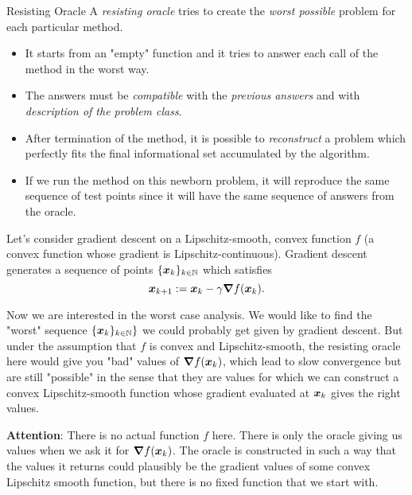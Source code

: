 \begin{colorboxnote}{Resisting Oracle}
    A \emph{resisting oracle} tries to create the \emph{worst possible} problem for each particular method.
    \begin{itemize}
        \item It starts from an "empty" function and it tries to answer each call of the method in the worst way.
        \item The answers must be \emph{compatible} with the \emph{previous answers} and with \emph{description of the problem class}.
        \item After termination of the method, it is possible to \emph{reconstruct} a problem which perfectly fits the final informational set accumulated by the algorithm.
        \item If we run the method on this newborn problem, it will reproduce the same sequence of test points since it will have the same sequence of answers from the oracle.
    \end{itemize}
\end{colorboxnote}

\begin{example}
    Let's consider gradient descent on a Lipschitz-smooth, convex function \(f\) (a convex function whose gradient is Lipschitz-continuous). Gradient descent generates a sequence 
    of points \(\{\boldsymbol{x}_k\}_{k \in \mathbb{N}}\) which satisfies
    \[
        \boldsymbol{x}_{k+1} := \boldsymbol{x}_{k} - \gamma \grad f(\boldsymbol{x}_{k}).
    \]

    Now we are interested in the worst case analysis. We would like to find the "worst" sequence \(\{\boldsymbol{x}_k\}_{k \in \mathbb{N}}\}\) we could probably get given by gradient descent.
    But under the assumption that \(f\) is convex and Lipschitz-smooth, the resisting oracle here would give you "bad" values of \(\grad f(\boldsymbol{x}_k)\), which lead to slow convergence but
    are still "possible" in the sense that they are values for which we can construct a convex Lipschitz-smooth function whose gradient evaluated at \(\boldsymbol{x}_k\) gives the right values.

    \textbf{Attention}: There is no actual function \(f\) here.  There is only the oracle giving us values when we ask it for \(\grad f(\boldsymbol{x}_k)\). The oracle is constructed in such a way 
    that the values it returns could plausibly be the gradient values of some convex Lipschitz smooth function, but there is no fixed function that we start with.
\end{example}

